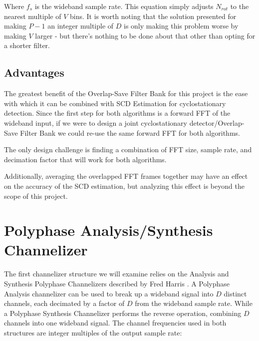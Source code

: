 \documentclass[12pt]{article}
\begin{document}
Where $f_s$ is the wideband sample rate. This equation simply adjusts $N_{rot}$
to the nearest multiple of $V$ bins. It is worth noting that the solution
presented for making $P-1$ an integer multiple of $D$ is only making this
problem worse by making $V$ larger - but there's nothing to be done about that
other than opting for a shorter filter.

\subsection{Advantages}
\label{sec:os_advantages}

The greatest benefit of the Overlap-Save Filter Bank for this project is the
ease with which it can be combined with SCD Estimation for cyclostationary
detection. Since the first step for both algorithms is a forward FFT of the
wideband input, if we were to design a joint cyclostationary
detector/Overlap-Save Filter Bank we could re-use the same forward FFT for both
algorithms.

The only design challenge is finding a combination of FFT size, sample rate,
and decimation factor that will work for both algorithms.



Additionally, averaging the overlapped FFT frames together may have an effect
on the accuracy of the SCD estimation, but analyzing this effect is beyond the
scope of this project.


\section{Polyphase Analysis/Synthesis Channelizer}
\label{sec:poly_chan}
The first channelizer structure we will examine relies on the Analysis and
Synthesis Polyphase Channelizers described by Fred Harris \cite{Harris1}.
A Polyphase Analysis channelizer can be used to break up a wideband signal into
$D$ distinct channels, each decimated by a factor of $D$ from the wideband
sample rate.  While a Polyphase Synthesis Channelizer performs the reverse
operation, combining $D$ channels into one wideband signal. The channel
frequencies used in both structures are integer multiples of the output sample
rate:
\end{document}

